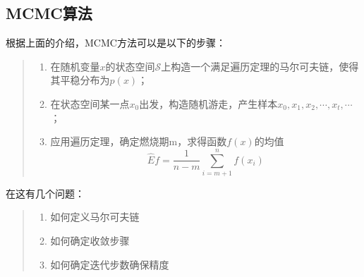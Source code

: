 \hypertarget{32-mcmcux7b97ux6cd5}{%
\subsection{MCMC算法}\label{32-mcmcux7b97ux6cd5}}

根据上面的介绍，MCMC方法可以是以下的步骤：

\begin{quote}
\begin{enumerate}
\def\labelenumi{\arabic{enumi}.}
\item 在随机变量\(x\)的状态空间\(\mathcal{S}\)上构造一个满足遍历定理的马尔可夫链，使得其平稳分布为\(p(x)\)；
\item 在状态空间某一点\(x_0\)出发，构造随机游走，产生样本\(x_0,x_1,x_2,\cdots,x_t,\cdots\)；
\item 应用遍历定理，确定燃烧期m，求得函数\(f(x)\)的均值
  \[\hat{E}f=\frac{1}{n-m}\sum_{i=m+1}^{n}f(x_i)\]
\end{enumerate}
\end{quote}
在这有几个问题：
\begin{quote}
\begin{enumerate}
\def\labelenumi{\arabic{enumi}.}
\item 如何定义马尔可夫链
\item 如何确定收敛步骤
\item 如何确定迭代步数确保精度
\end{enumerate}
\end{quote}
